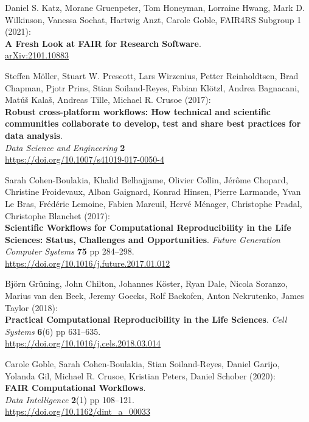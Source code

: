 \begin{thebibliography}{9}
Daniel S. Katz, Morane Gruenpeter, Tom Honeyman, Lorraine Hwang,
Mark D. Wilkinson, Vanessa Sochat, Hartwig Anzt, Carole Goble, FAIR4RS
Subgroup 1 (2021):\\
\textbf{A Fresh Look at FAIR for Research Software}.\\
\href{https://arxiv.org/abs/2101.10883}{arXiv:2101.10883}

Steffen Möller, Stuart W. Prescott, Lars Wirzenius, Petter
Reinholdtsen, Brad Chapman, Pjotr Prins, Stian Soiland-Reyes, Fabian
Klötzl, Andrea Bagnacani, Matúš Kalaš, Andreas Tille, Michael R. Crusoe
(2017):\\
\textbf{Robust cross-platform workflows: How technical and scientific
communities collaborate to develop, test and share best practices for
data analysis}.\\
\emph{Data Science and Engineering} \textbf{2}\\
\url{https://doi.org/10.1007/s41019-017-0050-4}

Sarah Cohen-Boulakia, Khalid Belhajjame, Olivier Collin, Jérôme
Chopard, Christine Froidevaux, Alban Gaignard, Konrad Hinsen, Pierre
Larmande, Yvan Le Bras, Frédéric Lemoine, Fabien Mareuil, Hervé Ménager,
Christophe Pradal, Christophe Blanchet (2017):\\
\textbf{Scientific Workflows for Computational Reproducibility in the
Life Sciences: Status, Challenges and Opportunities}. \emph{Future
Generation Computer Systems} \textbf{75} pp 284--298.\\
\url{https://doi.org/10.1016/j.future.2017.01.012}

Björn Grüning, John Chilton, Johannes Köster, Ryan Dale, Nicola
Soranzo, Marius van den Beek, Jeremy Goecks, Rolf Backofen, Anton
Nekrutenko, James Taylor (2018):\\
\textbf{Practical Computational Reproducibility in the Life Sciences}.
\emph{Cell Systems} \textbf{6}(6) pp 631--635.\\
\url{https://doi.org/10.1016/j.cels.2018.03.014}


Carole Goble, Sarah Cohen-Boulakia, Stian Soiland-Reyes, Daniel
Garijo, Yolanda Gil, Michael R. Crusoe, Kristian Peters, Daniel Schober
(2020):\\
\textbf{FAIR Computational Workflows}.\\
\emph{Data Intelligence} \textbf{2}(1) pp 108--121.\\
\url{https://doi.org/10.1162/dint_a_00033}


\end{thebibliography}
